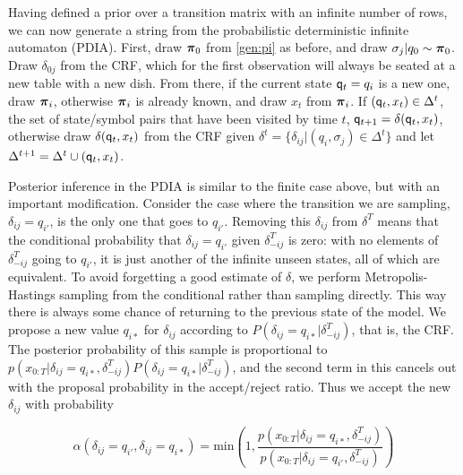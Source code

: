 Having defined a prior over a transition matrix with an infinite number of rows, we can now generate a string from the probabilistic deterministic infinite automaton (PDIA).  First, draw $\bpi_0$ from \eqref{gen:pi} as before, and draw $\sigma_j|q_0 \sim \bpi_0$.  Draw $\delta_{0j}$ from the CRF, which for the first observation will always be seated at a new table with a new dish.  From there, if the current state $\q_t = q_i$ is a new one, draw $\bpi_i$, otherwise $\bpi_i$ is already known, and draw $x_t$ from $\bpi_i$.  If $(\q_t,x_t) \in \Delta^t$, the set of state/symbol pairs that have been visited by time $t$, $\q_{t+1} = \delta(\q_t,x_t)$, otherwise draw $\delta(\q_t,x_t)$ from the CRF given $\delta^t = \{\delta_{ij}|(q_i,\sigma_j)\in\Delta^t\}$ and let $\Delta^{t+1} = \Delta^t \cup (\q_t,x_t)$.

Posterior inference in the PDIA is similar to the finite case above, but with an important modification.  Consider the case where the transition we are sampling, $\delta_{ij} = q_{i'}$, is the only one that goes to $q_{i'}$.  Removing this $\delta_{ij}$ from $\delta^T$ means that the conditional probability that $\delta_{ij} = q_{i'}$ given $\delta^T_{-ij}$ is zero: with no elements of $\delta^T_{-ij}$ going to $q_{i'}$, it is just another of the infinite unseen states, all of which are equivalent.  To avoid forgetting a good estimate of $\delta$, we perform Metropolis-Hastings sampling from the conditional rather than sampling directly.  This way there is always some chance of returning to the previous state of the model.  We propose a new value $q_{i*}$ for $\delta_{ij}$ according to $P(\delta_{ij} = q_{i*}|\delta^T_{-ij})$, that is, the CRF.  The posterior probability of this sample is proportional to $p(x_{0:T}|\delta_{ij}=q_{i*},\delta^T_{-ij})P(\delta_{ij} = q_{i*}|\delta^T_{-ij})$, and the second term in this cancels out with the proposal probability in the accept/reject ratio. Thus we accept the new $\delta_{ij}$ with probability

\begin{equation}
 \alpha(\delta_{ij}=q_{i'},\delta_{ij}=q_{i*}) =  \mathrm{min}\left(1,\frac{p(x_{0:T}|\delta_{ij}=q_{i*},\delta_{-ij}^T)}{p(x_{0:T}|\delta_{ij}=q_{i'},\delta_{-ij}^T)}\right) \label{delta:mh}
\end{equation}

